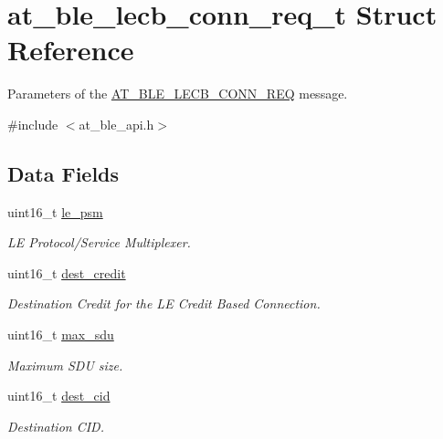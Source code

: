 \hypertarget{structat__ble__lecb__conn__req__t}{}\section{at\+\_\+ble\+\_\+lecb\+\_\+conn\+\_\+req\+\_\+t Struct Reference}
\label{structat__ble__lecb__conn__req__t}


Parameters of the \mbox{\hyperlink{at__ble__api_8h_a3324640b95f33169515f89738ed5baeba459fa57065ec575b1828a2381e373cc1}{A\+T\+\_\+\+B\+L\+E\+\_\+\+L\+E\+C\+B\+\_\+\+C\+O\+N\+N\+\_\+\+R\+EQ}} message.  




{\ttfamily \#include $<$at\+\_\+ble\+\_\+api.\+h$>$}

\subsection*{Data Fields}
\begin{DoxyCompactItemize}
\item 
uint16\+\_\+t \mbox{\hyperlink{structat__ble__lecb__conn__req__t_a2dad6ef37aefd9fc94375d265be0c7c9}{le\+\_\+psm}}
\begin{DoxyCompactList}\small\item\em LE Protocol/\+Service Multiplexer. \end{DoxyCompactList}\item 
uint16\+\_\+t \mbox{\hyperlink{structat__ble__lecb__conn__req__t_ac885778ddeb570d83c60b0d142d9de73}{dest\+\_\+credit}}
\begin{DoxyCompactList}\small\item\em Destination Credit for the LE Credit Based Connection. \end{DoxyCompactList}\item 
uint16\+\_\+t \mbox{\hyperlink{structat__ble__lecb__conn__req__t_a4b5effde26a738c2ddaad78c595bf745}{max\+\_\+sdu}}
\begin{DoxyCompactList}\small\item\em Maximum S\+DU size. \end{DoxyCompactList}\item 
uint16\+\_\+t \mbox{\hyperlink{structat__ble__lecb__conn__req__t_a37d822ac0a55245d703099a527d6bd3a}{dest\+\_\+cid}}
\begin{DoxyCompactList}\small\item\em Destination C\+ID. \end{DoxyCompactList}\end{DoxyCompactItemize}


